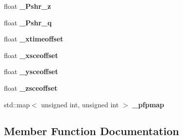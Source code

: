 \begin{DoxyCompactItemize}
\item 
float {\bfseries \+\_\+\+Pshr\+\_\+z}\hypertarget{classShowerMerger_af8094f3e46f6a4747a330afc1d2dc303}{}\label{classShowerMerger_af8094f3e46f6a4747a330afc1d2dc303}

\item 
float {\bfseries \+\_\+\+Pshr\+\_\+q}\hypertarget{classShowerMerger_ae2945b4d342ec4f487ed4798f017dd45}{}\label{classShowerMerger_ae2945b4d342ec4f487ed4798f017dd45}

\item 
float {\bfseries \+\_\+xtimeoffset}\hypertarget{classShowerMerger_a98adeb9a7abfcc0c4126f3c2fa394f26}{}\label{classShowerMerger_a98adeb9a7abfcc0c4126f3c2fa394f26}

\item 
float {\bfseries \+\_\+xsceoffset}\hypertarget{classShowerMerger_a060965f5293a88e921f4fcfc73494878}{}\label{classShowerMerger_a060965f5293a88e921f4fcfc73494878}

\item 
float {\bfseries \+\_\+ysceoffset}\hypertarget{classShowerMerger_a544004d4470bf7ead4c176685d58cfd6}{}\label{classShowerMerger_a544004d4470bf7ead4c176685d58cfd6}

\item 
float {\bfseries \+\_\+zsceoffset}\hypertarget{classShowerMerger_aa010b54e82a6bb0381946d7c064a9e7e}{}\label{classShowerMerger_aa010b54e82a6bb0381946d7c064a9e7e}

\item 
std\+::map$<$ unsigned int, unsigned int $>$ {\bfseries \+\_\+pfpmap}\hypertarget{classShowerMerger_ad0e0ff1fb206209963efb0690a3e9504}{}\label{classShowerMerger_ad0e0ff1fb206209963efb0690a3e9504}

\end{DoxyCompactItemize}


\subsection{Member Function Documentation}
